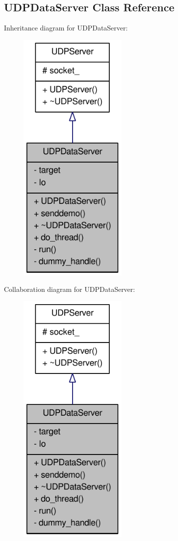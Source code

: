 \hypertarget{class_u_d_p_data_server}{
\subsection{UDPDataServer Class Reference}
\label{class_u_d_p_data_server}
}
Inheritance diagram for UDPDataServer:\nopagebreak
\begin{figure}[H]
\begin{center}
\leavevmode
\includegraphics[width=150pt]{class_u_d_p_data_server__inherit__graph}
\end{center}
\end{figure}
Collaboration diagram for UDPDataServer:\nopagebreak
\begin{figure}[H]
\begin{center}
\leavevmode
\includegraphics[width=150pt]{class_u_d_p_data_server__coll__graph}
\end{center}
\end{figure}
